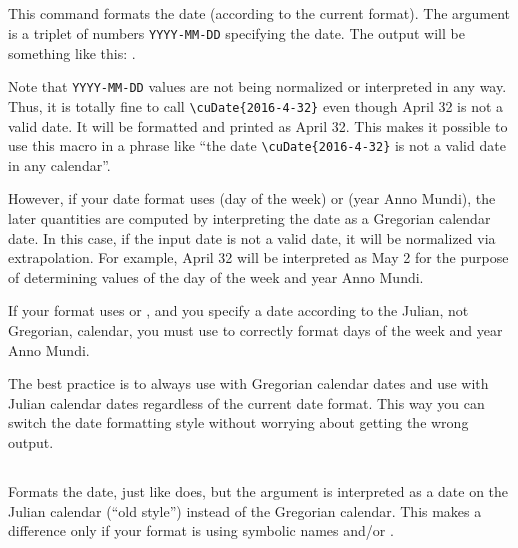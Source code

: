 \begin{EN}
\subsection{}
This command formats the date (according to the current format).
The argument is a triplet of numbers \texttt{YYYY-MM-DD} specifying
the date. The output will be something like this: .

Note that \texttt{YYYY-MM-DD} values are not being normalized or interpreted in any way. Thus, it is totally fine to
call \verb+\cuDate{2016-4-32}+ even though April 32 is not a valid date. It will be formatted and printed as April 32. This
makes it possible to use this macro in a phrase like ``the date \verb+\cuDate{2016-4-32}+ is not a valid date in any calendar''.

However, if your date format uses  (day of the week) or  (year Anno Mundi), the later quantities are computed by
interpreting the date as a Gregorian calendar date. In this case, if the input date is not a valid date, it will be normalized via extrapolation.
For example, April 32 will be interpreted as May 2 for the purpose of determining values of the day of the week and year Anno Mundi.

If your format uses  or , and you specify a date according to the Julian, not Gregorian, calendar, you must use  to
correctly format days of the week and year Anno Mundi.

The best practice is to always use  with Gregorian calendar dates and use  with Julian calendar dates regardless
of the current date format. This way you can switch the date formatting style without worrying about getting the wrong output.

\subsection{}
Formats the date, just like  does, but the argument is interpreted as a date on the Julian calendar (``old style'') instead of the Gregorian calendar.
This makes a difference only if your format is using symbolic names  and/or .
\end{EN}

